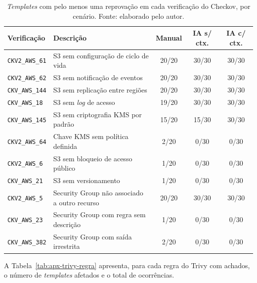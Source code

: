\begin{table}[H]
\centering
\caption{\textit{Templates} com pelo menos uma reprovação em cada verificação do Checkov, por cenário. Fonte: elaborado pelo autor.}
\label{tab:apx-checkov-regra}
\small
\begin{tabularx}{\textwidth}{l|>{\raggedright\arraybackslash}X|c|c|c}
\hline
\textbf{Verificação} & \textbf{Descrição} & \textbf{Manual} & \textbf{IA s/ ctx.} & \textbf{IA c/ ctx.} \\
\hline
\texttt{CKV2\_AWS\_61} & S3 sem configuração de ciclo de vida & 20/20 & 30/30 & 30/30 \\
\texttt{CKV2\_AWS\_62} & S3 sem notificação de eventos & 20/20 & 30/30 & 30/30 \\
\texttt{CKV\_AWS\_144} & S3 sem replicação entre regiões & 20/20 & 30/30 & 30/30 \\
\texttt{CKV\_AWS\_18} & S3 sem \textit{log} de acesso & 19/20 & 30/30 & 30/30 \\
\texttt{CKV\_AWS\_145} & S3 sem criptografia KMS por padrão & 15/20 & 15/30 & 30/30 \\
\texttt{CKV2\_AWS\_64} & Chave KMS sem política definida & 2/20 & 0/30 & 0/30 \\
\texttt{CKV2\_AWS\_6} & S3 sem bloqueio de acesso público & 1/20 & 0/30 & 0/30 \\
\texttt{CKV\_AWS\_21} & S3 sem versionamento & 1/20 & 0/30 & 0/30 \\
\hline
\texttt{CKV2\_AWS\_5} & Security Group não associado a outro recurso & 20/20 & 30/30 & 30/30 \\
\texttt{CKV\_AWS\_23} & Security Group com regra sem descrição & 1/20 & 0/30 & 0/30 \\
\texttt{CKV\_AWS\_382} & Security Group com saída irrestrita & 2/20 & 0/30 & 0/30 \\
\hline
\end{tabularx}
\end{table}

A Tabela~\ref{tab:apx-trivy-regra} apresenta, para cada regra do Trivy com achados, o número de \textit{templates} afetados e o total de ocorrências.

